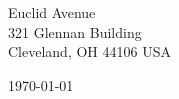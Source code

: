 \begin{minipage}{0.49\textwidth}
\begin{flushleft}
   Euclid Avenue\\
321 Glennan Building\\
Cleveland, OH 44106 USA
\end{flushleft}
\end{minipage}
\begin{minipage}{0.47\textwidth}
\begin{flushright}
\today
\end{flushright}
\end{minipage} \\

\newcommand{\univ}{Case Western Reserve University}
\newcommand{\univshort}{Case}
\newcommand{\degree}{M.Sc.}
\newcommand{\dept}{Computer Science}

